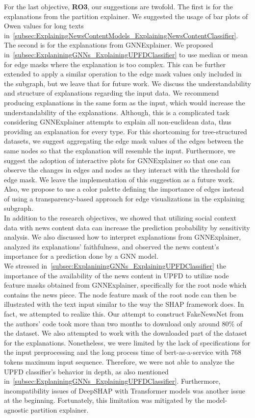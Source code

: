 For the last objective, \textbf{RO3}, our suggestions are twofold. The first is for the explanations from the partition explainer. We suggested the usage of bar plots of Owen values for long texts in~\ref{subsec:ExplainingNewsContentModels_ExplainingNewsContentClassifier}. The second is for the explanations from GNNExplainer. We proposed in~\ref{subsec:ExplaniningGNNs_ExplainingUPFDClassifier} to use median or mean for edge masks where the explanation is too complex. This can be further extended to apply a similar operation to the edge mask values only included in the subgraph, but we leave that for future work. We discuss the understandability and structure of explanations regarding the input data. We recommend producing explanations in the same form as the input, which would increase the understandability of the explanations. Although, this is a complicated task considering GNNExplainer attempts to explain all non-euclidean data, thus providing an explanation for every type. For this shortcoming for tree-structured datasets, we suggest aggregating the edge mask values of the edges between the same nodes so that the explanation will resemble the input. Furthermore, we suggest the adoption of interactive plots for GNNExplainer so that one can observe the changes in edges and nodes as they interact with the threshold for edge mask. We leave the implementation of this suggestion as a future work. Also, we propose to use a color palette defining the importance of edges instead of using a transparency-based approach for edge visualizations in the explaining subgraph.\\
In addition to the research objectives, we showed that utilizing social context data with news content data can increase the prediction probability by sensitivity analysis. We also discussed how to interpret explanations from GNNExplainer, analyzed its explanations' faithfulness, and observed the news content's importance for a prediction done by a GNN model.\\
We stressed in~\ref{subsec:ExplaniningGNNs_ExplainingUPFDClassifier} the importance of the availability of the news content in UPFD to utilize node feature masks obtained from GNNExplainer, specifically for the root node which contains the news piece. The node feature mask of the root node can then be illustrated with the text input similar to the way the SHAP framework does. In fact, we attempted to realize this. Our attempt to construct FakeNewsNet from the authors' code took more than two months to download only around 80\% of the dataset. We also attempted to work with the downloaded part of the dataset for the explanations. Nonetheless, we were limited by the lack of specifications for the input preprocessing and the long process time of bert-as-a-service with 768 tokens maximum input sequence. Therefore, we were not able to analyze the UPFD classifier's behavior in depth, as also mentioned in~\ref{subsec:ExplaniningGNNs_ExplainingUPFDClassifier}. Furthermore, incompatibility issues of DeepSHAP with Transformer models was another issue at the beginning. Fortunately, this limitation was mitigated by the model-agnostic partition explainer.\\
